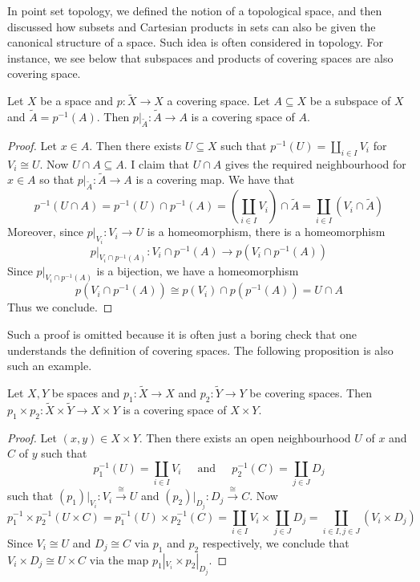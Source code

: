 \documentclass[a4paper]{article}
\begin{document}
In point set topology, we defined the notion of a topological space, and then discussed how subsets and Cartesian products in sets can also be given the canonical structure of a space. Such idea is often considered in topology. For instance, we see below that subspaces and products of covering spaces are also covering space. 

\begin{prp}{}{} Let $X$ be a space and $p:\tilde{X}\to X$ a covering space. Let $A\subseteq X$ be a subspace of $X$ and $\tilde{A}=p^{-1}(A)$. Then $p|_{\tilde{A}}:\tilde{A}\to A$ is a covering space of $A$. \tcbline
\begin{proof}
Let $x\in A$. Then there exists $U\subseteq X$ such that $p^{-1}(U)=\coprod_{i\in I}V_i$ for $V_i\cong U$. Now $U\cap A\subseteq A$. I claim that $U\cap A$ gives the required neighbourhood for $x\in A$ so that $p|_{\widetilde{A}}:\widetilde{A}\to A$ is a covering map. We have that $$p^{-1}(U\cap A)=p^{-1}(U)\cap p^{-1}(A)=\left(\coprod_{i\in I}V_i\right)\cap\tilde{A}=\coprod_{i\in I}(V_i\cap\widetilde{A})$$ Moreover, since $p|_{V_i}:V_i\to U$ is a homeomorphism, there is a homeomorphism $$p|_{V_i\cap p^{-1}(A)}:V_i\cap p^{-1}(A)\to p(V_i\cap p^{-1}(A))$$ Since $p|_{V_i\cap p^{-1}(A)}$ is a bijection, we have a homeomorphism $$p(V_i\cap p^{-1}(A))\cong p(V_i)\cap p(p^{-1}(A))=U\cap A$$ Thus we conclude. 
\end{proof}
\end{prp}

Such a proof is omitted because it is often just a boring check that one understands the definition of covering spaces. The following proposition is also such an example. 

\begin{prp}{}{} Let $X,Y$ be spaces and $p_1:\tilde{X}\to X$ and $p_2:\tilde{Y}\to Y$ be covering spaces. Then $p_1\times p_2:\tilde{X}\times\tilde{Y}\to X\times Y$ is a covering space of $X\times Y$. \tcbline
\begin{proof}
Let $(x,y)\in X\times Y$. Then there exists an open neighbourhood $U$ of $x$ and $C$ of $y$ such that $$p_1^{-1}(U)=\coprod_{i\in I}V_i\;\;\;\;\text{ and }\;\;\;\;p_2^{-1}(C)=\coprod_{j\in J}D_j$$ such that $(p_1)|_{V_i}:V_i\overset{\cong}{\longrightarrow}U$ and $(p_2)|_{D_j}:D_j\overset{\cong}{\longrightarrow}C$. Now $$p_1^{-1}\times p_2^{-1}(U\times C)=p_1^{-1}(U)\times p_2^{-1}(C)=\coprod_{i\in I}V_i\times\coprod_{j\in J}D_j=\coprod_{i\in I,j\in J}(V_i\times D_j)$$ Since $V_i\cong U$ and $D_j\cong C$ via $p_1$ and $p_2$ respectively, we conclude that $V_i\times D_j\cong U\times C$ via the map $p_1|_{V_i}\times p_2|_{D_j}$. 
\end{proof}
\end{prp}
\end{document}

